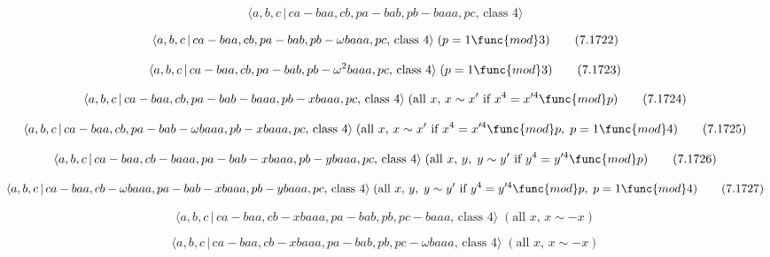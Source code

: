 \documentclass[10pt]{article}
\begin{document}
\begin{equation}
\langle a,b,c\,|\,ca-baa,cb,pa-bab,pb-baaa,pc,\,\text{class }4\rangle 
\tag{7.1721}
\end{equation}

\begin{equation}
\langle a,b,c\,|\,ca-baa,cb,pa-bab,pb-\omega baaa,pc,\,\text{class }4\rangle
\;(p=1\func{mod}3)  \tag{7.1722}
\end{equation}

\begin{equation}
\langle a,b,c\,|\,ca-baa,cb,pa-bab,pb-\omega ^{2}baaa,pc,\,\text{class }%
4\rangle \;(p=1\func{mod}3)  \tag{7.1723}
\end{equation}

\begin{equation}
\langle a,b,c\,|\,ca-baa,cb,pa-bab-baaa,pb-xbaaa,pc,\,\text{class }4\rangle
\;(\text{all }x,\,x\sim x^{\prime}\text{ if }x^4=x^{\prime 4}\func{mod}p) 
\tag{7.1724}
\end{equation}

\begin{equation}
\langle a,b,c\,|\,ca-baa,cb,pa-bab-\omega baaa,pb-xbaaa,pc,\,\text{class }%
4\rangle \;(\text{all }x,\,x\sim x^{\prime}\text{ if }x^4=x^{\prime 4}\func{%
mod}p,\;p=1\func{mod}4)  \tag{7.1725}
\end{equation}

\begin{equation}
\langle a,b,c\,|\,ca-baa,cb-baaa,pa-bab-xbaaa,pb-ybaaa,pc,\,\text{class }%
4\rangle \;(\text{all }x,\,y,\;y\sim y^{\prime }\text{ if }y^{4}=y^{\prime 4}%
\func{mod}p)  \tag{7.1726}
\end{equation}

\begin{equation}
\langle a,b,c\,|\,ca-baa,cb-\omega baaa,pa-bab-xbaaa,pb-ybaaa,pc,\,\text{%
class }4\rangle \;(\text{all }x,\,y,\;y\sim y^{\prime }\text{ if }%
y^{4}=y^{\prime 4}\func{mod}p,\;p=1\func{mod}4)  \tag{7.1727}
\end{equation}

\begin{equation}
\langle a,b,c\,|\,ca-baa,cb-xbaaa,pa-bab,pb,pc-baaa,\,\text{class }4\rangle
\;(\text{all }x,\,x\sim -x)  \tag{7.1728}
\end{equation}

\begin{equation}
\langle a,b,c\,|\,ca-baa,cb-xbaaa,pa-bab,pb,pc-\omega baaa,\,\text{class }%
4\rangle \;(\text{all }x,\,x\sim -x)  \tag{7.1729}
\end{equation}
\end{document}
